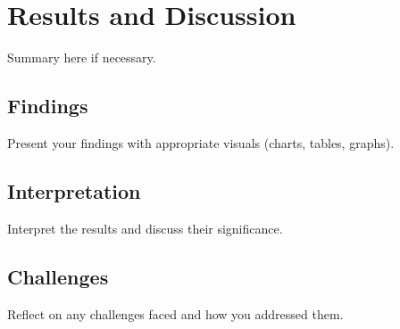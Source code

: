 \chapter{Results and Discussion}
\label{ch:results}

Summary here if necessary.

\section{Findings}
Present your findings with appropriate visuals (charts, tables, graphs).

\section{Interpretation}
Interpret the results and discuss their significance.

\section{Challenges}
Reflect on any challenges faced and how you addressed them.